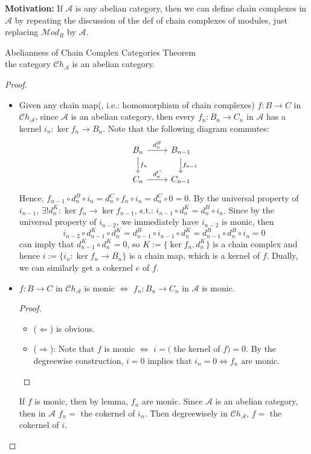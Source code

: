 \noindent\textbf{Motivation:} If $\mathcal{A}$ is any abelian category, then we can define chain complexes in $\mathcal{A}$ by repeating the discussion of the def of chain complexes of modules, just replacing $\mathcal{M}od_R$ by $\mathcal{A}$.

\begin{theorem}{Abelianness of Chain Complex Categories Theorem}\\
the category $\mathcal{C}h_\mathcal{A}$ is an abelian category.
\end{theorem}

\begin{proof}
    \begin{itemize}
        \item Given any chain map(, i.e.: homomorphism of chain complexes) $f:B\to C$ in $\mathcal{C} h_\mathcal{A}$, since $\mathcal{A}$ is an abelian category, then every $f_n:B_n \to C_n$ in $\mathcal{A}$ has a kernel $i_n: \ker f_n \to B_n$. Note that the following diagram commutes:
        \[
        \begin{tikzcd}
            B_n \arrow[r, "d_n^B"] \arrow[d, "f_n"] &B_{n-1} \arrow[d, "f_{n-1}"]\\
            C_n \arrow[r, "d_n^C"] & C_{n-1}
        \end{tikzcd}
        \]
        Hence, $f_{n-1} \circ d_n^B \circ i_n= d_n^C \circ f_n \circ i_n= d_n^C \circ 0=0$. By the universal property of $i_{n-1}$, $\exists! d_n^K: \ker f_n\to \ker f_{n-1}$, s.t.: $i_{n-1} \circ d_n^K= d_n^B \circ i_n$. Since by the universal property of $i_{n-2}$, we immediately have $i_{n-2}$ is monic, then
        \[
        i_{n-2} \circ d_{n-1}^K \circ d_n^K= d_{n-1}^B \circ i_{n-1} \circ d_n^K = d_{n-1}^B \circ d_{n}^B \circ i_n=0
        \]
        can imply that $d_{n-1}^K\circ d_n^K=0$, so $K:=\{ \ker f_n, d_n^K \}$ is a chain complex and hence $i:= \{i_n:\ker f_n\to B_n\}$ is a chain map, which is a kernel of $f$. Dually, we can similarly get a cokernel $e$ of $f$.

        \item \begin{lemma}
            $f:B\to C$ in $\mathcal{C}h_\mathcal{A}$ is monic $\Leftrightarrow$ $f_n: B_n\to C_n$ in $\mathcal{A}$ is monic.
        \end{lemma}
        \begin{proof}
            \begin{itemize}
                \item ($\Leftarrow$) is obvious.
                \item ($\Rightarrow$): Note that $f$ is monic $\Leftrightarrow$ $i=($ the kernel of $f)=0$. By the degreewise construction, $i=0$ implies that $i_n=0 \Leftrightarrow f_n$ are monic.
            \end{itemize}
        \end{proof}
        If $f$ is monic, then by lemma, $f_n$ are monic. Since $\mathcal{A}$ is an abelian category, then in $\mathcal{A}$ $f_n=$ the cokernel of $i_n$. Then degreewisely in $\mathcal{C}h_\mathcal{A}$, $f=$ the cokernel of $i$.


\end{itemize}
\end{proof}
